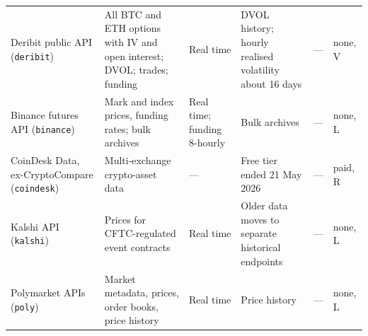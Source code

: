 \documentclass[10pt, a4paper, twocolumn]{article}
\newcommand{\sid}[1]{\texttt{\small #1}}   %
\newcommand{\ns}{---}                        %
\begin{document}
{\begin{longtable}{@{}L{3.1cm}L{4.65cm}L{1.85cm}L{2.5cm}L{2.7cm}L{1.35cm}@{}}
Deribit public API (\sid{deribit}) & All BTC and ETH options with IV and open interest; DVOL; trades; funding & Real time & DVOL history; hourly realised volatility about 16 days & \ns & none, V \\
Binance futures API (\sid{binance}) & Mark and index prices, funding rates; bulk archives & Real time; funding 8-hourly & Bulk archives & \ns & none, L \\
CoinDesk Data, ex-CryptoCompare (\sid{coindesk}) & Multi-exchange crypto-asset data & \ns & Free tier ended 21 May 2026 & \ns & paid, R \\
Kalshi API (\sid{kalshi}) & Prices for CFTC-regulated event contracts & Real time & Older data moves to separate historical endpoints & \ns & none, L \\
Polymarket APIs (\sid{poly}) & Market metadata, prices, order books, price history & Real time & Price history & \ns & none, L \\
\end{longtable}
}
\end{document}
